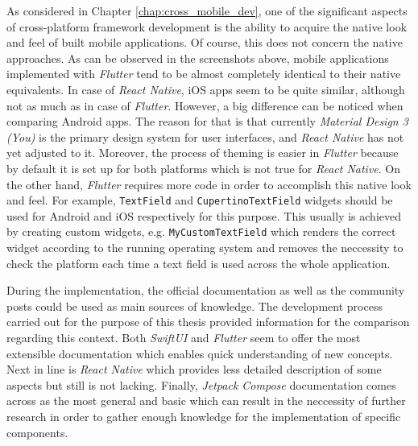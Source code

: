 As considered in Chapter \ref{chap:cross_mobile_dev}, one of the significant aspects of cross-platform framework development is the ability to acquire the native look and feel of built mobile applications. Of course, this does not concern the native approaches. As can be observed in the screenshots above, mobile applications implemented with \emph{Flutter} tend to be almost completely identical to their native equivalents. In case of \emph{React Native}, iOS apps seem to be quite similar, although not as much as in case of \emph{Flutter}. However, a big difference can be noticed when comparing Android apps. The reason for that is that currently \emph{Material Design 3 (You)} is the primary design system for user interfaces, and \emph{React Native} has not yet adjusted to it. Moreover, the process of theming is easier in \emph{Flutter} because by default it is set up for both platforms which is not true for \emph{React Native}. On the other hand, \emph{Flutter} requires more code in order to accomplish this native look and feel. For example, \texttt{TextField} and \texttt{CupertinoTextField} widgets should be used for Android and iOS respectively for this purpose. This usually is achieved by creating custom widgets, e.g. \texttt{MyCustomTextField} which renders the correct widget according to the running operating system and removes the neccessity to check the platform each time a text field is used across the whole application.

During the implementation, the official documentation as well as the community posts could be used as main sources of knowledge. The development process carried out for the purpose of this thesis provided information for the comparison regarding this context. Both \emph{SwiftUI} and \emph{Flutter} seem to offer the most extensible documentation which enables quick understanding of new concepts. Next in line is \emph{React Native} which provides less detailed description of some aspects but still is not lacking. Finally, \emph{Jetpack Compose} documentation comes across as the most general and basic which can result in the neccessity of further research in order to gather enough knowledge for the implementation of specific components.
